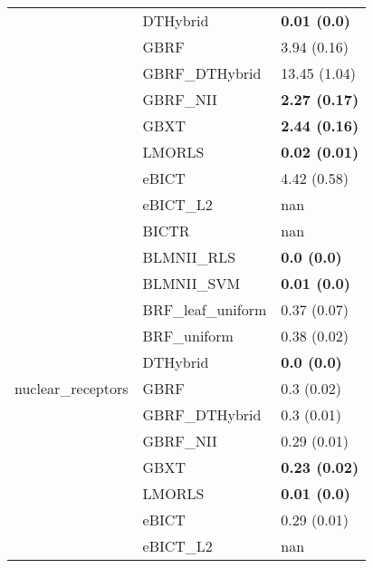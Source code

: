 \begin{tabular}{lll}
 & DTHybrid & \textbf{0.01 (0.0)} \\
 & GBRF & 3.94 (0.16) \\
 & GBRF\_DTHybrid & 13.45 (1.04) \\
 & GBRF\_NII & \textbf{2.27 (0.17)} \\
 & GBXT & \textbf{2.44 (0.16)} \\
 & LMORLS & \textbf{0.02 (0.01)} \\
 & eBICT & 4.42 (0.58) \\
 & eBICT\_L2 & nan \\
\cline{1-2}
\multirow[c]{13}{*}{nuclear\_receptors} & BICTR & nan \\
 & BLMNII\_RLS & \textbf{0.0 (0.0)} \\
 & BLMNII\_SVM & \textbf{0.01 (0.0)} \\
 & BRF\_leaf\_uniform & 0.37 (0.07) \\
 & BRF\_uniform & 0.38 (0.02) \\
 & DTHybrid & \textbf{0.0 (0.0)} \\
 & GBRF & 0.3 (0.02) \\
 & GBRF\_DTHybrid & 0.3 (0.01) \\
 & GBRF\_NII & 0.29 (0.01) \\
 & GBXT & \textbf{0.23 (0.02)} \\
 & LMORLS & \textbf{0.01 (0.0)} \\
 & eBICT & 0.29 (0.01) \\
 & eBICT\_L2 & nan \\
\cline{1-2}
\bottomrule
\end{tabular}
